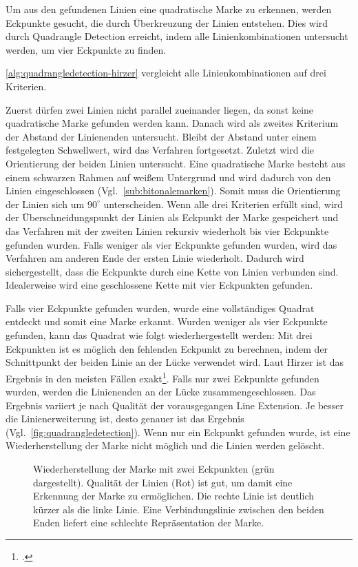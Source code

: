 Um aus den gefundenen Linien eine quadratische Marke zu erkennen, werden Eckpunkte gesucht, die durch Überkreuzung der
 Linien entstehen. Dies wird durch Quadrangle Detection erreicht, indem alle Linienkombinationen untersucht werden, um
 vier Eckpunkte zu finden.

\autoref{alg:quadrangledetection-hirzer} vergleicht alle Linienkombinationen auf drei Kriterien.

Zuerst dürfen zwei Linien nicht parallel zueinander liegen, da sonst keine quadratische Marke gefunden werden kann.
 Danach wird als zweites Kriterium der Abstand der Linienenden untersucht. Bleibt der Abstand unter einem festgelegten
 Schwellwert, wird das Verfahren fortgesetzt. Zuletzt wird die Orientierung der beiden Linien untersucht. Eine
 quadratische Marke besteht aus einem schwarzen Rahmen auf weißem Untergrund und wird dadurch von den Linien
 eingeschlossen (Vgl.~\autoref{sub:bitonalemarken}). Somit muss die Orientierung der Linien sich um $90^\circ$
 unterscheiden. Wenn alle drei Kriterien erfüllt sind, wird der Überschneidungspunkt der Linien als Eckpunkt der Marke
 gespeichert und das Verfahren mit der zweiten Linien rekursiv wiederholt bis vier Eckpunkte gefunden wurden. Falls
 weniger als vier Eckpunkte gefunden wurden, wird das Verfahren am anderen Ende der ersten Linie wiederholt. Dadurch
 wird sichergestellt, dass die Eckpunkte durch eine Kette von Linien verbunden sind. Idealerweise wird eine
 geschlossene Kette mit vier Eckpunkten gefunden.

Falls vier Eckpunkte gefunden wurden, wurde eine vollständiges Quadrat entdeckt und somit eine Marke erkannt. Wurden
 weniger als vier Eckpunkte gefunden, kann das Quadrat wie folgt wiederhergestellt werden: Mit drei Eckpunkten ist es
 möglich den fehlenden Eckpunkt zu berechnen, indem der Schnittpunkt der beiden Linie an der Lücke verwendet wird. Laut
 Hirzer ist das Ergebnis in den meisten Fällen exakt\footcite[Vgl.][S.15]{hirzer08}. Falls nur zwei Eckpunkte gefunden
 wurden, werden die Linienenden an der Lücke zusammengeschlossen. Das Ergebnis variiert je nach Qualität der
 vorausgegangen Line Extension. Je besser die Linienerweiterung ist, desto genauer ist das Ergebnis
 (Vgl.~\autoref{fig:quadrangledetection}). Wenn nur ein Eckpunkt gefunden wurde, ist eine Wiederherstellung der Marke
 nicht möglich und die Linien werden gelöscht.
\begin{figure}[!ht]
	\centering
	\caption{Wiederherstellung der Marke mit zwei Eckpunkten (grün dargestellt).
	  Qualität der Linien (Rot) ist gut, um damit eine Erkennung der Marke zu
	 ermöglichen.  Die rechte Linie ist deutlich kürzer als die linke Linie. Eine
	 Verbindungslinie zwischen den beiden Enden liefert eine schlechte Repräsentation der Marke.}
	\label{fig:quadrangledetection}
\end{figure}

